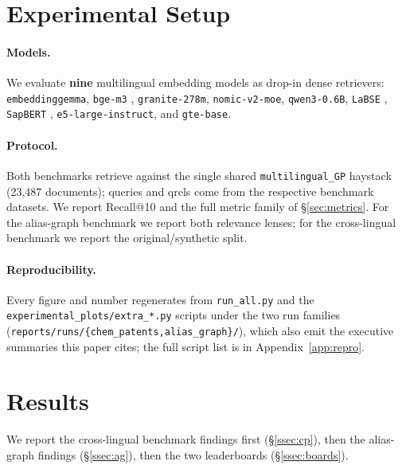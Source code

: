 \documentclass[11pt]{article}
\begin{document}
\section{Experimental Setup}
\label{sec:setup}

\paragraph{Models.}
We evaluate \textbf{nine} multilingual embedding models as drop-in dense
retrievers: \texttt{embeddinggemma}, \texttt{bge-m3} \citep{bgem3_2024},
\texttt{granite-278m}, \texttt{nomic-v2-moe}, \texttt{qwen3-0.6B},
\texttt{LaBSE} \citep{labse2022}, \texttt{SapBERT} \citep{sapbert2021},
\texttt{e5-large-instruct}, and \texttt{gte-base}.

\paragraph{Protocol.}
Both benchmarks retrieve against the single shared \texttt{multilingual\_GP}
haystack (23{,}487 documents); queries and qrels come from the respective
benchmark datasets. We report Recall@10 and the full metric family of
\S\ref{sec:metrics}. For the alias-graph benchmark we report both relevance
lenses; for the cross-lingual benchmark we report the original/synthetic split.

\paragraph{Reproducibility.}
Every figure and number regenerates from \texttt{run\_all.py} and the
\texttt{experimental\_plots/extra\_*.py} scripts under the two run families
(\texttt{reports/runs/\{chem\_patents,alias\_graph\}/}), which also emit the
executive summaries this paper cites; the full script list is in
Appendix~\ref{app:repro}.

\section{Results}
\label{sec:results}

We report the cross-lingual benchmark findings first (\S\ref{ssec:cp}), then
the alias-graph findings (\S\ref{ssec:ag}), then the two leaderboards
(\S\ref{ssec:boards}).
\end{document}
